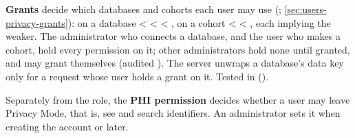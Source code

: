 \textbf{Grants} decide which databases and cohorts each user may use (;
\cref{sec:users-privacy-grants}): on a database  <  <  <
, on a cohort  <  < , each implying the weaker.
The administrator who connects a database, and the user who makes a cohort, hold every
permission on it; other administrators hold none until granted, and may grant themselves (audited
). The server unwraps a database's data key only for a request whose user holds
a grant on it. Tested in 
().

Separately from the role, the \textbf{PHI permission} decides whether a user may leave Privacy
Mode, that is, see and search identifiers. An administrator sets it when creating the account or
later.
